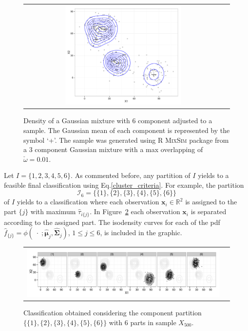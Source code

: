 \documentclass[10pt, a4paper]{article}
\newcommand{\m}[1]{\boldsymbol{#1}}
\begin{document}
\begin{spacing}{1.9}
\begin{figure}[thbp]
\begin{center}
\begin{tabular}{cc}
  \includegraphics[trim=0cm 0cm 0cm 0cm,width=0.6\textwidth]{partition-example-mixture.pdf} \\
 \end{tabular}
 \caption{Density of a Gaussian mixture with 6 component adjusted to a sample. The Gaussian mean of each component is represented by the symbol `+'. The sample was generated using R \textsc{MixSim} package from a 3 component Gaussian mixture with a max overlapping of $\check{\omega} = 0.01$.}\label{ex_mixture}
\end{center}
\end{figure}

Let $I = \{1,2,3,4,5,6\}$. As commented before, any partition of $I$ yields to a feasible final classification using Eq.\ref{cluster_criteria}. For example, the partition
\[
\mathcal{I}_6 = \{\{1\},\{2\},\{3\},\{4\},\{5\},\{6\}\}
\]
of $I$ yields to a classification where each observation $\m x_i \in \mathbb{R}^2$ is  assigned to the part $\{j\}$ with maximum $\hat{\tau}_{i\{j\}}$. In Figure~\ref{ex_part6} each observation $\m x_i$ is separated according to the assigned part. The isodensity curves for each of the pdf $\hat{f}_{\{j\}} = \phi(\;\cdot\; ; \hat{\m\mu}_j, \hat{\m\Sigma}_j)$, $1\leq j \leq 6$, is included in the graphic.

\begin{figure}[!h]
\begin{center}
\begin{tabular}{cc}
  \includegraphics[trim=0cm 0cm 0cm 0cm,width=\textwidth]{partition-example-part6.pdf} \\
 \end{tabular}
 \caption{Classification obtained considering the component partition $\{ \{1\}, \{2\}, \{3\}, \{4\}, \{5\}, \{6\} \}$ with 6 parts in sample $X_{500}$.}\label{ex_part6}
\end{center}
\end{figure}


\end{spacing}
\end{document}
